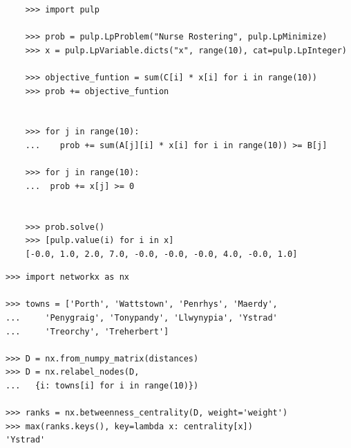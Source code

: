\documentclass{beamer}
\begin{document}
\begin{frame}[fragile]
  \scriptsize{
  \begin{verbatim}
    >>> import pulp

    >>> prob = pulp.LpProblem("Nurse Rostering", pulp.LpMinimize)
    >>> x = pulp.LpVariable.dicts("x", range(10), cat=pulp.LpInteger)

    >>> objective_funtion = sum(C[i] * x[i] for i in range(10))
    >>> prob += objective_funtion


    >>> for j in range(10):
    ...    prob += sum(A[j][i] * x[i] for i in range(10)) >= B[j]

    >>> for j in range(10):
    ...  prob += x[j] >= 0


    >>> prob.solve()
    >>> [pulp.value(i) for i in x]
    [-0.0, 1.0, 2.0, 7.0, -0.0, -0.0, -0.0, 4.0, -0.0, 1.0]
  \end{verbatim}
  }
\end{frame}


\frame{
  \begin{center}
      
  \end{center}
}

\begin{frame}[fragile]
\small{
\begin{verbatim}
>>> import networkx as nx

>>> towns = ['Porth', 'Wattstown', 'Penrhys', 'Maerdy',
...     'Penygraig', 'Tonypandy', 'Llwynypia', 'Ystrad'
...     'Treorchy', 'Treherbert']

>>> D = nx.from_numpy_matrix(distances)
>>> D = nx.relabel_nodes(D,
...   {i: towns[i] for i in range(10)})

>>> ranks = nx.betweenness_centrality(D, weight='weight')
>>> max(ranks.keys(), key=lambda x: centrality[x])
'Ystrad'
\end{verbatim}
}
\end{frame}

\end{document}
